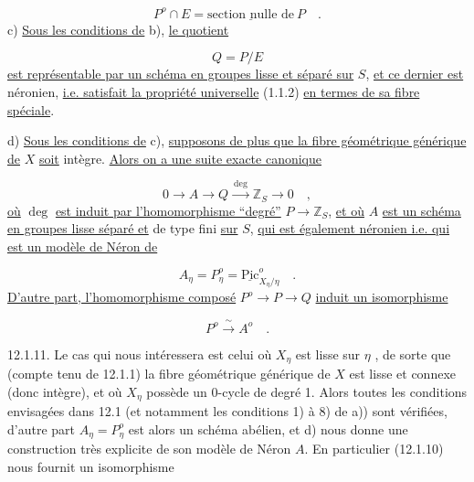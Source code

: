 \begin{equation}\tag{12.1.6}
P^o \cap E = \underline{\mbox{section nulle de}}\ P
\quad .
\end{equation}
c) \underline{Sous les conditions de} b), \underline{le quotient}

\begin{equation}\tag{12.1.7}
Q = P/E
\end{equation}
\underline{est représentable par un schéma en groupes lisse et séparé sur} $S$, \underline{et ce dernier est} néronien, \underline{i.e. satisfait la propriété universelle} (1.1.2) \underline{en termes de sa fibre spéciale}.

d) \underline{Sous les conditions de} c), \underline{supposons de plus que la fibre géométrique générique de} $X$ \underline{soit} intègre. \underline{Alors on a une suite exacte canonique}

\begin{equation}\tag{12.1.8}
0 \longrightarrow A \longrightarrow Q \xrightarrow{\ \deg\ } \mathbb{Z}_S \longrightarrow 0 \quad ,
\end{equation}
\underline{où} $\deg$ \underline{est induit par l'homomorphisme ``degré''} $P \longrightarrow \mathbb{Z}_S$, \underline{et où} $A$ \underline{est un schéma en groupes lisse séparé et} de type fini \underline{sur} $S$, \underline{qui est également néronien i.e. qui est un modèle de Néron de}

\begin{equation}\tag{12.1.9}
A_\eta = P_\eta^o = \underline{\mathrm{Pic}}^o_{X_\eta/\eta} \quad .
\end{equation}
\underline{D'autre part, l'homomorphisme composé} $P^o \longrightarrow P \to Q$ \underline{induit un isomorphisme}

\begin{equation}\tag{12.1.10}
P^o \xrightarrow{\ \sim\ } A^o \quad .
\end{equation}


12.1.11. Le cas qui nous intéressera est celui où $X_\eta$ est lisse sur $\eta$ , de sorte que (compte tenu de 12.1.1) la fibre géométrique générique de $X$ est lisse et connexe (donc intègre), et où $X_\eta$ possède un $0$-cycle de degré 1. Alors toutes les conditions envisagées dans 12.1 (et notamment les conditions 1) à 8) de a)) sont vérifiées, d'autre part $A_\eta = P_\eta^o$ est alors un schéma abélien, et d) nous donne une construction très explicite de son modèle de Néron $A$. En particulier (12.1.10) nous fournit un isomorphisme

